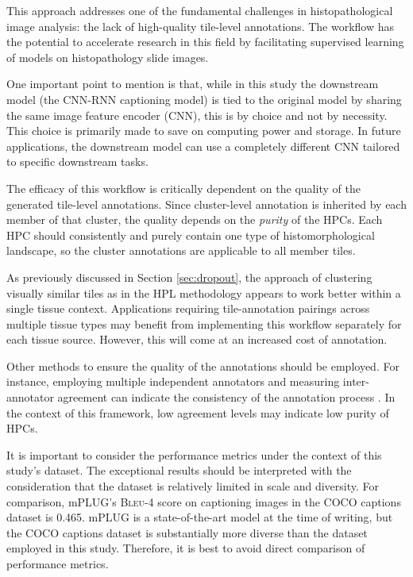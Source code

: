 \documentclass{l4proj}
\begin{document}
This approach addresses one of the fundamental challenges in histopathological image analysis: the lack of high-quality tile-level annotations. The workflow has the potential to accelerate research in this field by facilitating supervised learning of models on histopathology slide images.

One important point to mention is that, while in this study the downstream model (the CNN-RNN captioning model) is tied to the original model by sharing the same image feature encoder (CNN), this is by choice and not by necessity. This choice is primarily made to save on computing power and storage. In future applications, the downstream model can use a completely different CNN tailored to specific downstream tasks.

The efficacy of this workflow is critically dependent on the quality of the generated tile-level annotations. Since cluster-level annotation is inherited by each member of that cluster, the quality depends on the \emph{purity} of the HPCs. Each HPC should consistently and purely contain one type of histomorphological landscape, so the cluster annotations are applicable to all member tiles.

As previously discussed in Section \ref{sec:dropout}, the approach of clustering visually similar tiles as in the HPL methodology appears to work better within a single tissue context. Applications requiring tile-annotation pairings across multiple tissue types may benefit from implementing this workflow separately for each tissue source. However, this will come at an increased cost of annotation.

Other methods to ensure the quality of the annotations should be employed. For instance, employing multiple independent annotators and measuring inter-annotator agreement can indicate the consistency of the annotation process \citep{Artstein2017}. In the context of this framework, low agreement levels may indicate low purity of HPCs. 

It is important to consider the performance metrics under the context of this study's dataset. The exceptional results should be interpreted with the consideration that the dataset is relatively limited in scale and diversity. For comparison, mPLUG's \textsc{Bleu-4} score on captioning images in the COCO captions dataset is 0.465. mPLUG is a state-of-the-art model at the time of writing, but the COCO captions dataset is substantially more diverse than the dataset employed in this study. Therefore, it is best to avoid direct comparison of performance metrics.
\end{document}

